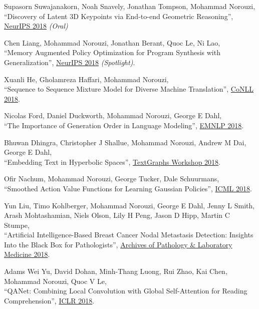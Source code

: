 \documentclass[10pt,letterpaper]{article}
\renewenvironment{itemize}{
  \begin{list}{}{
    \setlength{\leftmargin}{1.5em}
  }
}{
  \end{list}
}
\begin{document}
\begin{itemize}
\item Supasorn Suwajanakorn, Noah Snavely, Jonathan Tompson, Mohammad Norouzi,\\
``Discovery of Latent 3D Keypoints via End-to-end Geometric Reasoning'',
\href{https://arxiv.org/pdf/1807.03146}{NeurIPS 2018} {\em (Oral)}

\item Chen Liang, Mohammad Norouzi, Jonathan Berant, Quoc Le, Ni Lao,\\
``Memory Augmented Policy Optimization for Program Synthesis with Generalization'',
\href{https://arxiv.org/pdf/1807.02322}{NeurIPS 2018} {\em (Spotlight)}.


\item Xuanli He, Gholamreza Haffari, Mohammad Norouzi,\\
``Sequence to Sequence Mixture Model for Diverse Machine Translation'',
\href{https://arxiv.org/pdf/1810.07391}{CoNLL 2018}.

\item Nicolas Ford, Daniel Duckworth, Mohammad Norouzi, George E Dahl,\\
``The Importance of Generation Order in Language Modeling'',
\href{https://arxiv.org/pdf/1808.07910}%
{EMNLP 2018}.

\item Bhuwan Dhingra, Christopher J Shallue, Mohammad Norouzi, Andrew M Dai, George E Dahl,\\
``Embedding Text in Hyperbolic Spaces'',
\href{https://arxiv.org/pdf/1806.04313.pdf}%
{TextGraphs Workshop 2018}.

\item Ofir Nachum, Mohammad Norouzi, George Tucker, Dale Schuurmans,\\
``Smoothed Action Value Functions for Learning Gaussian Policies'',
\href{https://arxiv.org/pdf/1803.02348}%
{ICML 2018}.

\item Yun Liu, Timo Kohlberger, Mohammad Norouzi, George E Dahl, Jenny L Smith, Arash Mohtashamian, Niels Olson, Lily H Peng, Jason D Hipp, Martin C Stumpe,\\
``Artificial Intelligence-Based Breast Cancer Nodal Metastasis Detection: Insights Into the Black Box for Pathologists'',
\href{http://www.archivesofpathology.org/doi/pdf/10.5858/arpa.2018-0147-OA}
{Archives of Pathology \& Laboratory Medicine 2018}.

\item Adams Wei Yu, David Dohan, Minh-Thang Luong, Rui Zhao, Kai Chen, Mohammad Norouzi, Quoc V Le,\\
``QANet: Combining Local Convolution with Global Self-Attention for Reading Comprehension'',
\href{https://arxiv.org/pdf/1804.09541.pdf}%
{ICLR 2018}.


\end{itemize}
\end{document}
